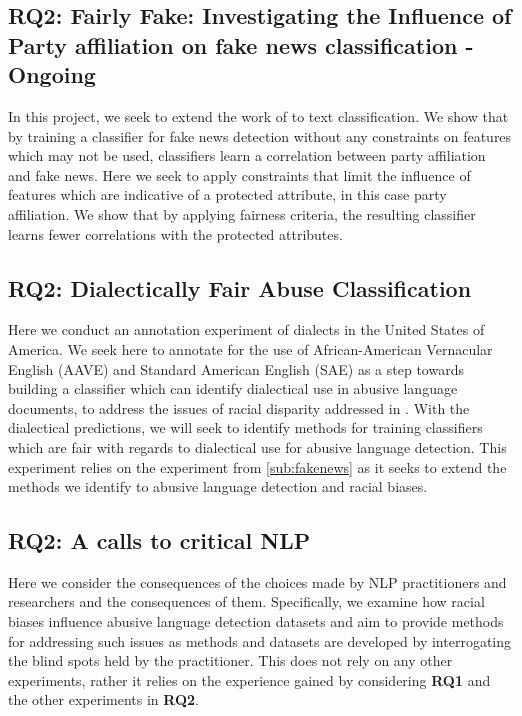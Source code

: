 \subsection{RQ2: Fairly Fake: Investigating the Influence of Party affiliation on fake news classification - Ongoing}\label{sub:fakenews}
In this project, we seek to extend the work of \cite{Agarwal:2018} to text classification. We show that by training a classifier for fake news detection without any constraints on features which may not be used, classifiers learn a correlation between party affiliation and fake news. Here we seek to apply constraints that limit the influence of features which are indicative of a protected attribute, in this case party affiliation. We show that by applying fairness criteria, the resulting classifier learns fewer correlations with the protected attributes.

\subsection{RQ2: Dialectically Fair Abuse Classification}\label{sub:aave}
Here we conduct an annotation experiment of dialects in the United States of America. We seek here to annotate for the use of African-American Vernacular English (AAVE) and Standard American English (SAE) as a step towards building a classifier which can identify dialectical use in abusive language documents, to address the issues of racial disparity addressed in \cite{Waseem:2018,Sap:2019}. With the dialectical predictions, we will seek to identify methods for training classifiers which are fair with regards to dialectical use for abusive language detection. This experiment relies on the experiment from \autoref{sub:fakenews} as it seeks to extend the methods we identify to abusive language detection and racial biases.

\subsection{RQ2: A calls to critical NLP}\label{sub:critical}
Here we consider the consequences of the choices made by NLP practitioners and researchers and the consequences of them. Specifically, we examine how racial biases influence abusive language detection datasets and aim to provide methods for addressing such issues as methods and datasets are developed by interrogating the blind spots held by the practitioner. This does not rely on any other experiments, rather it relies on the experience gained by considering {\bf RQ1} and the other experiments in {\bf RQ2}.


